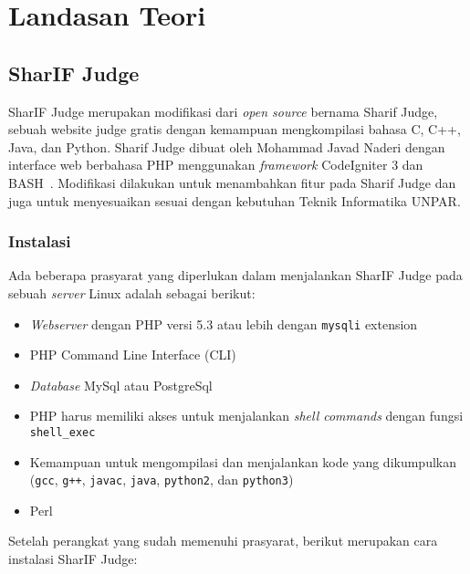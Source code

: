 \chapter{Landasan Teori}
\label{chap:teori}


\section{SharIF Judge}
\label{sec:2:sharifjudge}

SharIF Judge merupakan modifikasi dari \textit{open source} bernama Sharif Judge, sebuah website judge gratis dengan kemampuan mengkompilasi bahasa C, C++, Java, dan Python. Sharif Judge dibuat oleh Mohammad Javad Naderi dengan interface web berbahasa PHP menggunakan \textit{framework} CodeIgniter 3 dan BASH~\cite{sharif}. Modifikasi dilakukan untuk menambahkan fitur pada Sharif Judge dan juga untuk menyesuaikan sesuai dengan kebutuhan Teknik Informatika UNPAR.

\subsection{Instalasi}
\label{sub:2:1:instalasi}

Ada beberapa prasyarat yang diperlukan dalam menjalankan SharIF Judge pada sebuah \textit{server} Linux adalah sebagai berikut:

\begin{itemize}
	\item \textit{Webserver} dengan PHP versi 5.3 atau lebih dengan \texttt{mysqli} extension
	\item PHP Command Line Interface (CLI)
	\item \textit{Database} MySql atau PostgreSql
	\item PHP harus memiliki akses untuk menjalankan \textit{shell commands} dengan fungsi \verb|shell_exec|
	\item Kemampuan untuk mengompilasi dan menjalankan kode yang dikumpulkan (\texttt{gcc}, \texttt{g++}, \texttt{javac}, \texttt{java}, \texttt{python2}, dan \texttt{python3})
	\item Perl
\end{itemize}

Setelah perangkat yang sudah memenuhi prasyarat, berikut merupakan cara instalasi SharIF Judge:

